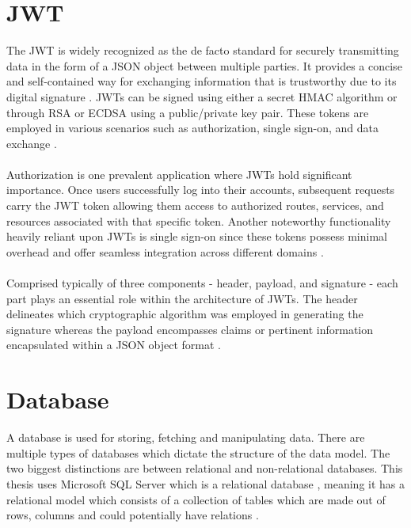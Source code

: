 \documentclass[BIF,Bachelor,nenglish]{twbook}%
\begin{document}
\section{\ac{JWT}}
The \ac{JWT} is widely recognized as the de facto standard for securely transmitting data in the form of a JSON object between multiple parties. It provides a concise and self-contained way for exchanging information that is trustworthy due to its digital signature \cite{akanajwt}. \ac{JWT}s can be signed using either a secret HMAC algorithm or through RSA or ECDSA using a public/private key pair. These tokens are employed in various scenarios such as authorization, single sign-on, and data exchange \cite{oauthjwt}.
\\
\\
Authorization is one prevalent application where \ac{JWT}s hold significant importance. Once users successfully log into their accounts, subsequent requests carry the \ac{JWT} token allowing them access to authorized routes, services, and resources associated with that specific token. Another noteworthy functionality heavily reliant upon \ac{JWT}s is single sign-on since these tokens possess minimal overhead and offer seamless integration across different domains \cite{jwt, oauthjwt}.
\\
\\
Comprised typically of three components - header, payload, and signature - each part plays an essential role within the architecture of \ac{JWT}s. The header delineates which cryptographic algorithm was employed in generating the signature whereas the payload encompasses claims or pertinent information encapsulated within a JSON object format \cite{superjwt}.

\section{Database}
A database is used for storing, fetching and manipulating data. There are multiple types of databases which dictate the structure of the data model. The two biggest distinctions are between relational and non-relational databases. This thesis uses Microsoft SQL Server which is a relational database \cite{whatmsSQLdb}, meaning it has a relational model which consists of a collection of tables which are made out of rows, columns and could potentially have relations \cite{oraclereldb, ibmreldb}.
\end{document}
